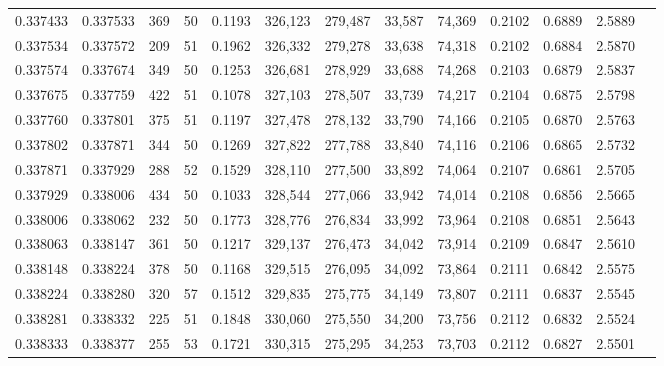 \begin{tabular}{rrrrrrrrrrrrr}
0.337433 & 0.337533 &   369 &  50 &                                     0.1193 & 326,123 & 279,487 &  33,587 &  74,369 & 0.2102 & 0.6889 & 2.5889 \\
0.337534 & 0.337572 &   209 &  51 &                                     0.1962 & 326,332 & 279,278 &  33,638 &  74,318 & 0.2102 & 0.6884 & 2.5870 \\
0.337574 & 0.337674 &   349 &  50 &                                     0.1253 & 326,681 & 278,929 &  33,688 &  74,268 & 0.2103 & 0.6879 & 2.5837 \\
0.337675 & 0.337759 &   422 &  51 &                                     0.1078 & 327,103 & 278,507 &  33,739 &  74,217 & 0.2104 & 0.6875 & 2.5798 \\
0.337760 & 0.337801 &   375 &  51 &                                     0.1197 & 327,478 & 278,132 &  33,790 &  74,166 & 0.2105 & 0.6870 & 2.5763 \\
0.337802 & 0.337871 &   344 &  50 &                                     0.1269 & 327,822 & 277,788 &  33,840 &  74,116 & 0.2106 & 0.6865 & 2.5732 \\
0.337871 & 0.337929 &   288 &  52 &                                     0.1529 & 328,110 & 277,500 &  33,892 &  74,064 & 0.2107 & 0.6861 & 2.5705 \\
0.337929 & 0.338006 &   434 &  50 &                                     0.1033 & 328,544 & 277,066 &  33,942 &  74,014 & 0.2108 & 0.6856 & 2.5665 \\
0.338006 & 0.338062 &   232 &  50 &                                     0.1773 & 328,776 & 276,834 &  33,992 &  73,964 & 0.2108 & 0.6851 & 2.5643 \\
0.338063 & 0.338147 &   361 &  50 &                                     0.1217 & 329,137 & 276,473 &  34,042 &  73,914 & 0.2109 & 0.6847 & 2.5610 \\
0.338148 & 0.338224 &   378 &  50 &                                     0.1168 & 329,515 & 276,095 &  34,092 &  73,864 & 0.2111 & 0.6842 & 2.5575 \\
0.338224 & 0.338280 &   320 &  57 &                                     0.1512 & 329,835 & 275,775 &  34,149 &  73,807 & 0.2111 & 0.6837 & 2.5545 \\
0.338281 & 0.338332 &   225 &  51 &                                     0.1848 & 330,060 & 275,550 &  34,200 &  73,756 & 0.2112 & 0.6832 & 2.5524 \\
0.338333 & 0.338377 &   255 &  53 &                                     0.1721 & 330,315 & 275,295 &  34,253 &  73,703 & 0.2112 & 0.6827 & 2.5501 \\

\end{tabular}
